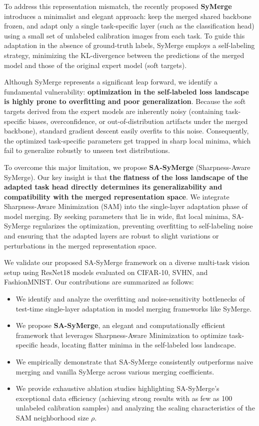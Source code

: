 \documentclass{article}
\theoremstyle{plain}
\theoremstyle{definition}
\theoremstyle{remark}
\begin{document}
To address this representation mismatch, the recently proposed \textbf{SyMerge} \cite{jung2026symerge} introduces a minimalist and elegant approach: keep the merged shared backbone frozen, and adapt only a single task-specific layer (such as the classification head) using a small set of unlabeled calibration images from each task. To guide this adaptation in the absence of ground-truth labels, SyMerge employs a self-labeling strategy, minimizing the KL-divergence between the predictions of the merged model and those of the original expert model (soft targets).

Although SyMerge represents a significant leap forward, we identify a fundamental vulnerability: \textbf{optimization in the self-labeled loss landscape is highly prone to overfitting and poor generalization}. Because the soft targets derived from the expert models are inherently noisy (containing task-specific biases, overconfidence, or out-of-distribution artifacts under the merged backbone), standard gradient descent easily overfits to this noise. Consequently, the optimized task-specific parameters get trapped in sharp local minima, which fail to generalize robustly to unseen test distributions.

To overcome this major limitation, we propose \textbf{SA-SyMerge} (Sharpness-Aware SyMerge). Our key insight is that \textbf{the flatness of the loss landscape of the adapted task head directly determines its generalizability and compatibility with the merged representation space}. We integrate Sharpness-Aware Minimization (SAM) \cite{foret2020sharpness} into the single-layer adaptation phase of model merging. By seeking parameters that lie in wide, flat local minima, SA-SyMerge regularizes the optimization, preventing overfitting to self-labeling noise and ensuring that the adapted layers are robust to slight variations or perturbations in the merged representation space.

We validate our proposed SA-SyMerge framework on a diverse multi-task vision setup using ResNet18 models \cite{he2016deep} evaluated on CIFAR-10, SVHN, and FashionMNIST. Our contributions are summarized as follows:
\begin{itemize}
    \item We identify and analyze the overfitting and noise-sensitivity bottlenecks of test-time single-layer adaptation in model merging frameworks like SyMerge.
    \item We propose \textbf{SA-SyMerge}, an elegant and computationally efficient framework that leverages Sharpness-Aware Minimization to optimize task-specific heads, locating flatter minima in the self-labeled loss landscape.
    \item We empirically demonstrate that SA-SyMerge consistently outperforms naive merging and vanilla SyMerge across various merging coefficients.
    \item We provide exhaustive ablation studies highlighting SA-SyMerge's exceptional data efficiency (achieving strong results with as few as 100 unlabeled calibration samples) and analyzing the scaling characteristics of the SAM neighborhood size $\rho$.
\end{itemize}
\end{document}
